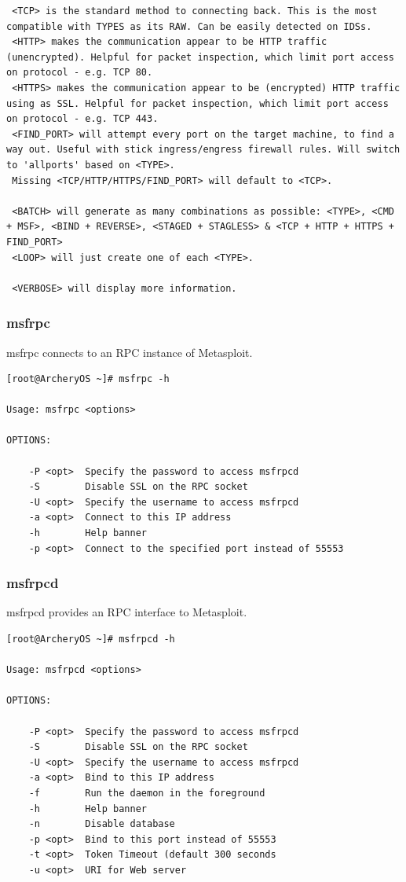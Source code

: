 \documentclass{article}
\begin{document}
\begin{lstlisting}
 <TCP> is the standard method to connecting back. This is the most compatible with TYPES as its RAW. Can be easily detected on IDSs.
 <HTTP> makes the communication appear to be HTTP traffic (unencrypted). Helpful for packet inspection, which limit port access on protocol - e.g. TCP 80.
 <HTTPS> makes the communication appear to be (encrypted) HTTP traffic using as SSL. Helpful for packet inspection, which limit port access on protocol - e.g. TCP 443.
 <FIND_PORT> will attempt every port on the target machine, to find a way out. Useful with stick ingress/engress firewall rules. Will switch to 'allports' based on <TYPE>.
 Missing <TCP/HTTP/HTTPS/FIND_PORT> will default to <TCP>.

 <BATCH> will generate as many combinations as possible: <TYPE>, <CMD + MSF>, <BIND + REVERSE>, <STAGED + STAGLESS> & <TCP + HTTP + HTTPS + FIND_PORT> 
 <LOOP> will just create one of each <TYPE>.

 <VERBOSE> will display more information.
\end{lstlisting}

\subsubsection{msfrpc}
msfrpc connects to an RPC instance of Metasploit.
\begin{lstlisting}
[root@ArcheryOS ~]# msfrpc -h

Usage: msfrpc <options>

OPTIONS:

    -P <opt>  Specify the password to access msfrpcd
    -S        Disable SSL on the RPC socket
    -U <opt>  Specify the username to access msfrpcd
    -a <opt>  Connect to this IP address
    -h        Help banner
    -p <opt>  Connect to the specified port instead of 55553
\end{lstlisting}

\subsubsection{msfrpcd}
msfrpcd provides an RPC interface to Metasploit.
\begin{lstlisting}
[root@ArcheryOS ~]# msfrpcd -h

Usage: msfrpcd <options>

OPTIONS:

    -P <opt>  Specify the password to access msfrpcd
    -S        Disable SSL on the RPC socket
    -U <opt>  Specify the username to access msfrpcd
    -a <opt>  Bind to this IP address
    -f        Run the daemon in the foreground
    -h        Help banner
    -n        Disable database
    -p <opt>  Bind to this port instead of 55553
    -t <opt>  Token Timeout (default 300 seconds
    -u <opt>  URI for Web server
\end{lstlisting}
\end{document}
